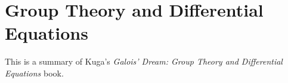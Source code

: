 \chapter{Group Theory and Differential Equations}
This is a summary of Kuga's \emph{Galois' Dream: Group Theory and
  Differential Equations} book.



